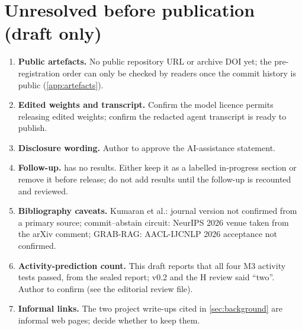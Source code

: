 \section*{Unresolved before publication (draft only)}
\begin{enumerate}[leftmargin=*]
  \item \textbf{Public artefacts.} No public repository URL or archive DOI yet; the pre-registration order can only be
        checked by readers once the commit history is public (\cref{app:artefacts}).
  \item \textbf{Edited weights and transcript.} Confirm the model licence permits releasing edited weights; confirm the
        redacted agent transcript is ready to publish.
  \item \textbf{Disclosure wording.} Author to approve the AI-assistance statement.
  \item \textbf{Follow-up.}  has no results. Either keep it as a labelled in-progress section or
        remove it before release; do not add results until the follow-up is recounted and reviewed.
  \item \textbf{Bibliography caveats.} Kumaran et al.: journal version not confirmed from a primary source;
        commit--abstain circuit: NeurIPS 2026 venue taken from the arXiv comment; GRAB-RAG: AACL-IJCNLP 2026
        acceptance not confirmed.
  \item \textbf{Activity-prediction count.} This draft reports that all four M3 activity tests passed, from the
        sealed report; v0.2 and the H review said ``two''. Author to confirm (see the editorial review file).
  \item \textbf{Informal links.} The two project write-ups cited in \cref{sec:background} are informal web pages;
        decide whether to keep them.
\end{enumerate}
